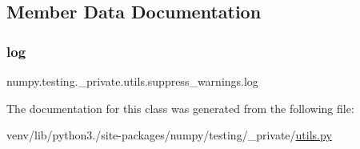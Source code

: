 \subsection{Member Data Documentation}
\mbox{\label{classnumpy_1_1testing_1_1__private_1_1utils_1_1suppress__warnings_a2c36222e96feb7fae6edbb1a090f597e}} 
\subsubsection{\texorpdfstring{log}{log}}
{\footnotesize\ttfamily numpy.\+testing.\+\_\+private.\+utils.\+suppress\+\_\+warnings.\+log}



The documentation for this class was generated from the following file\+:\begin{DoxyCompactItemize}
\item 
venv/lib/python3./site-\/packages/numpy/testing/\+\_\+private/\hyperlink{numpy_2testing_2__private_2utils_8py}{utils.\+py}\end{DoxyCompactItemize}
